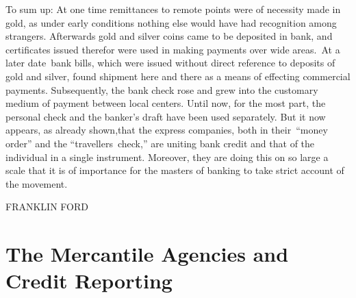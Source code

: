 \documentclass[openany,nobib]{tufte-book}
\let\oldchapter\chapter
\def\chapter{%
  \setcounter{footnote}{0}%
  \oldchapter
}
\begin{document}
To sum up: At one time remittances to remote points were of necessity
made in gold, as under early conditions nothing else would have had
recognition among strangers. Afterwards gold and silver coins came to be
deposited in bank, and certificates issued therefor were used in making
payments over wide areas.~At a later date~bank bills, which were issued
without direct reference to deposits of gold and silver, found shipment
here and there as a means of effecting commercial payments.
Subsequently, the bank check rose and grew into the customary medium of
payment between local centers. Until now, for the most part, the
personal check and the banker's draft have been used separately. But it
now appears, as already shown,\newpage\noindent that the express companies, both in
their~``money order'' and the ``travellers~check,'' are uniting bank
credit and that of the individual in a single instrument. Moreover, they
are doing this on so large a scale that it is of importance for the
masters of banking to take strict account of the movement.~

\vspace{0.2in}

\hfill{\Large FRANKLIN FORD}

\vspace{0.1in}

\hspace{0.25in}{\large February 8, 1899}

\chapter[The Mercantile Agencies and Credit Reporting]{The Mercantile Agencies and Credit Reporting}
\label{ch:The Mercantile Agencies and Credit Reporting}

\vspace{.2in}

\begin{LARGE}


\end{LARGE}
\end{document}
